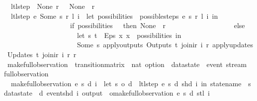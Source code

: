 \begin{isabellebody}
\ \ {\isachardoublequoteopen}ltl{\isacharunderscore}step\ {\isacharunderscore}\ None\ r\ {\isacharunderscore}\ {\isacharequal}\ {\isacharparenleft}None{\isacharcomma}\ {\isacharbrackleft}{\isacharbrackright}{\isacharcomma}\ r{\isacharparenright}{\isachardoublequoteclose}\ {\isacharbar}\isanewline
\ \ {\isachardoublequoteopen}ltl{\isacharunderscore}step\ e\ {\isacharparenleft}Some\ s{\isacharparenright}\ r\ {\isacharparenleft}l{\isacharcomma}\ i{\isacharparenright}\ {\isacharequal}\ {\isacharparenleft}let\ possibilities\ {\isacharequal}\ possible{\isacharunderscore}steps\ e\ s\ r\ l\ i\ in\isanewline
\ \ \ \ \ \ \ \ \ \ \ \ \ \ \ \ \ \ \ if\ possibilities\ {\isacharequal}\ {\isacharbraceleft}{\isacharbar}{\isacharbar}{\isacharbraceright}\ then\ {\isacharparenleft}None{\isacharcomma}\ {\isacharbrackleft}{\isacharbrackright}{\isacharcomma}\ r{\isacharparenright}\isanewline
\ \ \ \ \ \ \ \ \ \ \ \ \ \ \ \ \ \ \ else\isanewline
\ \ \ \ \ \ \ \ \ \ \ \ \ \ \ \ \ \ \ \ \ let\ {\isacharparenleft}s{\isacharprime}{\isacharcomma}\ t{\isacharparenright}\ {\isacharequal}\ Eps\ {\isacharparenleft}{\isasymlambda}x{\isachardot}\ x\ {\isacharbar}{\isasymin}{\isacharbar}\ possibilities{\isacharparenright}\ in\isanewline
\ \ \ \ \ \ \ \ \ \ \ \ \ \ \ \ \ \ \ \ \ {\isacharparenleft}Some\ s{\isacharprime}{\isacharcomma}\ {\isacharparenleft}apply{\isacharunderscore}outputs\ {\isacharparenleft}Outputs\ t{\isacharparenright}\ {\isacharparenleft}join{\isacharunderscore}ir\ i\ r{\isacharparenright}{\isacharparenright}{\isacharcomma}\ {\isacharparenleft}apply{\isacharunderscore}updates\ {\isacharparenleft}Updates\ t{\isacharparenright}\ {\isacharparenleft}join{\isacharunderscore}ir\ i\ r{\isacharparenright}\ r{\isacharparenright}{\isacharparenright}\isanewline
\ \ \ \ \ \ \ \ \ \ \ \ \ \ \ \ \ \ {\isacharparenright}{\isachardoublequoteclose}\isanewline
\isanewline
{}\isamarkupfalse%
\ make{\isacharunderscore}full{\isacharunderscore}observation\ {\isacharcolon}{\isacharcolon}\ {\isachardoublequoteopen}transition{\isacharunderscore}matrix\ {\isasymRightarrow}\ nat\ option\ {\isasymRightarrow}\ datastate\ {\isasymRightarrow}\ event\ stream\ {\isasymRightarrow}\ full{\isacharunderscore}observation{\isachardoublequoteclose}\ \isanewline
\ \ {\isachardoublequoteopen}make{\isacharunderscore}full{\isacharunderscore}observation\ e\ s\ d\ i\ {\isacharequal}\ {\isacharparenleft}let\ {\isacharparenleft}s{\isacharprime}{\isacharcomma}\ o{\isacharprime}{\isacharcomma}\ d{\isacharprime}{\isacharparenright}\ {\isacharequal}\ ltl{\isacharunderscore}step\ e\ s\ d\ {\isacharparenleft}shd\ i{\isacharparenright}\ in\ {\isasymlparr}statename\ {\isacharequal}\ s{\isacharcomma}\ datastate\ {\isacharequal}\ d{\isacharcomma}\ event{\isacharequal}{\isacharparenleft}shd\ i{\isacharparenright}{\isacharcomma}\ output\ {\isacharequal}\ o{\isacharprime}{\isasymrparr}{\isacharhash}{\isacharhash}{\isacharparenleft}make{\isacharunderscore}full{\isacharunderscore}observation\ e\ s{\isacharprime}\ d{\isacharprime}\ {\isacharparenleft}stl\ i{\isacharparenright}{\isacharparenright}{\isacharparenright}{\isachardoublequoteclose}\isanewline

\end{isabellebody}
